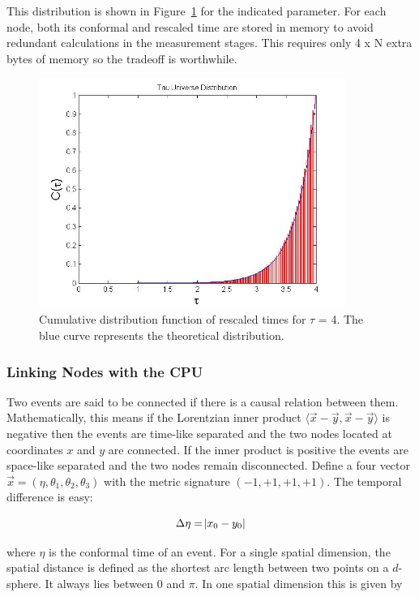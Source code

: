 \documentclass[preprint,notitlepage,amsmath,amssymb,floatfix]{revtex4-1}
\begin{document}
\noindent This distribution is shown in Figure~\ref{fig:tau_cdf} for the indicated parameter.
For each node, both its conformal and rescaled time are stored in memory to avoid redundant calculations in the measurement stages.
This requires only 4 x N extra bytes of memory so the tradeoff is worthwhile.

\begin{figure}
\includegraphics[width=10cm]{figures/tau_dist.jpg}
\caption{Cumulative distribution function of rescaled times for $\tau$ = 4.  The blue curve represents the theoretical distribution.}
\label{fig:tau_cdf}
\centering
\end{figure}

\subsubsection{Linking Nodes with the CPU}
Two events are said to be connected if there is a causal relation between them.  
Mathematically, this means if the Lorentzian inner product $\langle \vec x - \vec y, \vec x - \vec y\rangle$ is negative then the events are time-like separated and the two nodes located at coordinates $x$ and $y$ are connected.  
If the inner product is positive the events are space-like separated and the two nodes remain disconnected.
Define a four vector $\vec x = \left(\eta, \theta_1, \theta_2, \theta_3\right)$ with the metric signature $\left(-1,+1,+1,+1\right)$.
The temporal difference is easy:

\begin{equation}
\Delta\eta = \abs{x_0 - y_0}
\end{equation}

\noindent where $\eta$ is the conformal time of an event.  
For a single spatial dimension, the spatial distance is defined as the shortest arc length between two points on a $d$-sphere.  
It always lies between 0 and $\pi$.
In one spatial dimension this is given by
\end{document}
